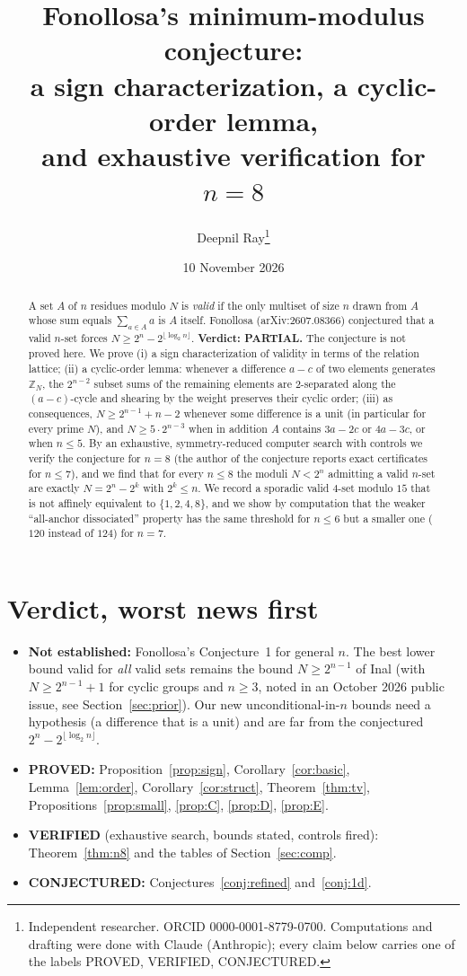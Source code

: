 \documentclass[11pt]{article}
\title{Fonollosa's minimum-modulus conjecture:\\ a sign characterization, a cyclic-order lemma,\\ and exhaustive verification for $n=8$}
\author{Deepnil Ray\thanks{Independent researcher. ORCID 0000-0001-8779-0700. Computations and drafting were done with Claude (Anthropic); every claim below carries one of the labels PROVED, VERIFIED, CONJECTURED.}}
\date{10 November 2026}
\theoremstyle{definition}
\newcommand{\Z}{\mathbb{Z}}
\begin{document}
\maketitle

\begin{abstract}
A set $A$ of $n$ residues modulo $N$ is \emph{valid} if the only multiset of size $n$ drawn from $A$ whose sum equals $\sum_{a\in A}a$ is $A$ itself. Fonollosa (arXiv:2607.08366) conjectured that a valid $n$-set forces $N\ge 2^n-2^{\lfloor\log_2 n\rfloor}$. \textbf{Verdict: PARTIAL.} The conjecture is not proved here. We prove (i) a sign characterization of validity in terms of the relation lattice; (ii) a cyclic-order lemma: whenever a difference $a-c$ of two elements generates $\Z_N$, the $2^{n-2}$ subset sums of the remaining elements are $2$-separated along the $(a-c)$-cycle and shearing by the weight preserves their cyclic order; (iii) as consequences, $N\ge 2^{n-1}+n-2$ whenever some difference is a unit (in particular for every prime $N$), and $N\ge 5\cdot 2^{n-3}$ when in addition $A$ contains $3a-2c$ or $4a-3c$, or when $n\le5$. By an exhaustive, symmetry-reduced computer search with controls we verify the conjecture for $n=8$ (the author of the conjecture reports exact certificates for $n\le 7$), and we find that for every $n\le 8$ the moduli $N<2^n$ admitting a valid $n$-set are exactly $N=2^n-2^k$ with $2^k\le n$. We record a sporadic valid $4$-set modulo $15$ that is not affinely equivalent to $\{1,2,4,8\}$, and we show by computation that the weaker ``all-anchor dissociated'' property has the same threshold for $n\le 6$ but a smaller one ($120$ instead of $124$) for $n=7$.
\end{abstract}

\section{Verdict, worst news first}
\begin{itemize}
\item \textbf{Not established:} Fonollosa's Conjecture~1 for general $n$. The best lower bound valid for \emph{all} valid sets remains the bound $N\ge 2^{n-1}$ of Inal (with $N\ge 2^{n-1}+1$ for cyclic groups and $n\ge3$, noted in an October 2026 public issue, see Section~\ref{sec:prior}). Our new unconditional-in-$n$ bounds need a hypothesis (a difference that is a unit) and are far from the conjectured $2^n-2^{\lfloor\log_2 n\rfloor}$.
\item \textbf{PROVED:} Proposition~\ref{prop:sign}, Corollary~\ref{cor:basic}, Lemma~\ref{lem:order}, Corollary~\ref{cor:struct}, Theorem~\ref{thm:tv}, Propositions~\ref{prop:small}, \ref{prop:C}, \ref{prop:D}, \ref{prop:E}.
\item \textbf{VERIFIED} (exhaustive search, bounds stated, controls fired): Theorem~\ref{thm:n8} and the tables of Section~\ref{sec:comp}.
\item \textbf{CONJECTURED:} Conjectures~\ref{conj:refined} and~\ref{conj:1d}.
\end{itemize}
\end{document}
